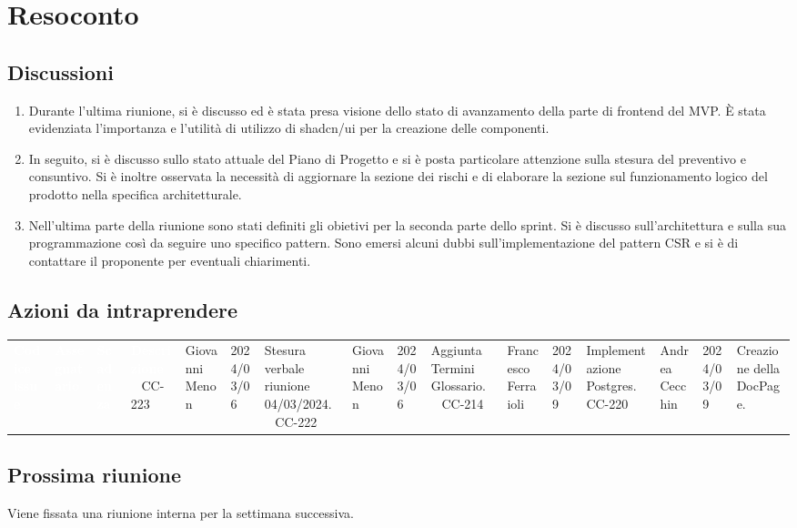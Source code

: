 \section{Resoconto} \label{sec:resoconto}
\subsection{Discussioni} \label{subsec:resdiscussione}
\begin{enumerate}
    \item Durante l'ultima riunione, si è discusso ed è stata presa visione dello stato di avanzamento della parte di frontend del MVP. È stata evidenziata l'importanza e l'utilità di utilizzo di shadcn/ui per la creazione delle componenti.
    \item In seguito, si è discusso sullo stato attuale del Piano di Progetto e si è posta particolare attenzione sulla stesura del preventivo e consuntivo. Si è inoltre osservata la necessità di aggiornare la sezione dei rischi e di elaborare la sezione sul funzionamento logico del prodotto nella specifica architetturale.
    \item Nell'ultima parte della riunione sono stati definiti gli obietivi per la seconda parte dello sprint. Si è discusso sull'architettura e sulla sua programmazione così da seguire uno specifico pattern. Sono emersi alcuni dubbi sull'implementazione del pattern CSR e si è di contattare il proponente per eventuali chiarimenti.
\end{enumerate}



\subsection{Azioni da intraprendere}
{
\setlength{\tabcolsep}{10pt}
\renewcommand{\arraystretch}{1.5}
\begin{tabularx}{\textwidth}{| l | l | l | X |}
\hline
{}\textbf{\textcolor{white}{Codice issue}} & \textbf{\textcolor{white}{Assegnatario}} & \textbf{\textcolor{white}{Scadenza}} & \textbf{\textcolor{white}{Descrizione}} \
\hline
CC-223 & Giovanni Menon &2024/03/06 & Stesura verbale riunione 04/03/2024. \
\hline
CC-222 & Giovanni Menon &2024/03/06 & Aggiunta Termini Glossario. \
\hline
CC-214 & Francesco Ferraioli &2024/03/09 & Implementazione Postgres. \
\hline
CC-220 & Andrea Cecchin &2024/03/09 & Creazione della DocPage. \
\hline
\end{tabularx}
}


\subsection{Prossima riunione} \label{subsec:riunione}
Viene fissata una riunione interna per la settimana successiva.